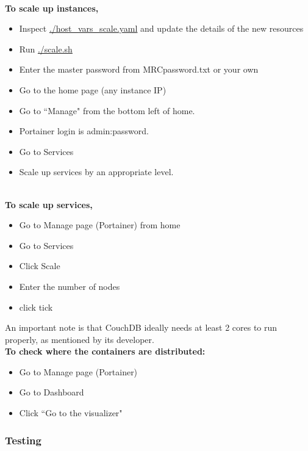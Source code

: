 \\

\textbf{To scale up instances,}

\begin{itemize}
    \item Inspect \href{https://bitbucket.org/comp90024team39/comp90024-a2/src/master/deployment/host_vars_scale.yaml}{./host\_vars\_scale.yaml} and update the details of the new resources
    \item Run \href{https://bitbucket.org/comp90024team39/comp90024-a2/src/master/deployment/init.sh}{./scale.sh}
    \item Enter the master password from MRCpassword.txt or your own
    \item Go to the home page (any instance IP) 
    \item Go to ``Manage" from the bottom left of home.
    \item Portainer login is admin:password. 
    \item Go to Services 
    \item Scale up services by an appropriate level.  
\end{itemize}

\\

\textbf{To scale up services,} 
\begin{itemize}
    \item Go to Manage page (Portainer) from home
    \item Go to Services 
    \item Click Scale
    \item Enter the number of nodes
    \item click tick
\end{itemize}

An important note is that CouchDB ideally needs at least 2 cores to run properly, as mentioned by its developer. \\

\textbf{To check where the containers are distributed: }

\begin{itemize}
    \item Go to Manage page (Portainer)
    \item Go to Dashboard 
    \item Click ``Go to the visualizer"
\end{itemize}

\subsubsection{Testing}

